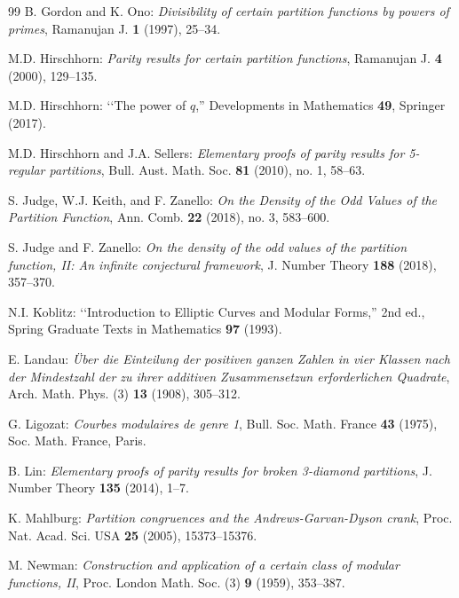\documentclass[12pt]{amsart}
\theoremstyle{definition}
\begin{document}
\begin{thebibliography}{99}
 B. Gordon and K. Ono: \emph{Divisibility of certain partition functions by powers of primes}, Ramanujan J. \textbf{1} (1997), 25--34.

 M.D. Hirschhorn: \emph{Parity results for certain partition functions}, Ramanujan J. \textbf{4}  (2000), 129--135.

 M.D. Hirschhorn: \lq \lq The power of $q$,'' Developments in Mathematics \textbf{49}, Springer (2017).

 M.D. Hirschhorn and J.A. Sellers: \emph{Elementary proofs of parity results for 5-regular partitions}, Bull. Aust. Math. Soc. \textbf{81} (2010), no. 1, 58--63.


 S. Judge, W.J. Keith, and F. Zanello: \emph{On the Density of the Odd Values of the Partition Function}, Ann. Comb. \textbf{22} (2018), no. 3, 583--600.

 S. Judge and F. Zanello: \emph{On the density of the odd values of the partition function, II: An infinite conjectural framework}, J. Number Theory \textbf{188} (2018), 357--370.

 N.I. Koblitz: \lq \lq Introduction to Elliptic Curves and Modular Forms,'' 2nd ed., Spring Graduate Texts in Mathematics \textbf{97} (1993).

 E. Landau: \emph{\"{U}ber die Einteilung der positiven ganzen Zahlen in vier Klassen nach der Mindestzahl der zu ihrer additiven Zusammensetzun erforderlichen Quadrate}, Arch. Math. Phys. (3) \textbf{13} (1908), 305--312.

 G. Ligozat: \emph{Courbes modulaires de genre 1}, Bull. Soc. Math. France \textbf{43}  (1975), Soc. Math. France, Paris.

 B. Lin: \emph{Elementary proofs of parity results for broken 3-diamond partitions}, J. Number Theory \textbf{135} (2014), 1--7.

 K. Mahlburg: \emph{Partition congruences and the Andrews-Garvan-Dyson crank}, Proc. Nat. Acad. Sci. USA \textbf{25} (2005), 15373--15376. %

 M. Newman: \emph{Construction and application of a certain class of modular functions, II},  Proc. London Math. Soc. (3) \textbf{9} (1959), 353--387.


\end{thebibliography}
\end{document}
